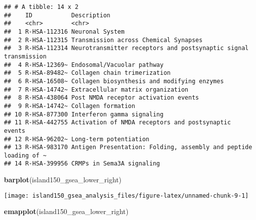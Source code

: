 \documentclass[
]{article}
\newenvironment{Shaded}{\begin{snugshade}}{\end{snugshade}}
\newcommand{\KeywordTok}[1]{\textcolor[rgb]{0.13,0.29,0.53}{\textbf{#1}}}
\newcommand{\NormalTok}[1]{#1}
\newcommand{\OperatorTok}[1]{\textcolor[rgb]{0.81,0.36,0.00}{\textbf{#1}}}
\newcommand{\StringTok}[1]{\textcolor[rgb]{0.31,0.60,0.02}{#1}}
\begin{document}
\begin{Shaded}
\end{Shaded}

\begin{verbatim}
## # A tibble: 14 x 2
##    ID           Description                                                     
##    <chr>        <chr>                                                           
##  1 R-HSA-112316 Neuronal System                                                 
##  2 R-HSA-112315 Transmission across Chemical Synapses                           
##  3 R-HSA-112314 Neurotransmitter receptors and postsynaptic signal transmission 
##  4 R-HSA-12369~ Endosomal/Vacuolar pathway                                      
##  5 R-HSA-89482~ Collagen chain trimerization                                    
##  6 R-HSA-16508~ Collagen biosynthesis and modifying enzymes                     
##  7 R-HSA-14742~ Extracellular matrix organization                               
##  8 R-HSA-438064 Post NMDA receptor activation events                            
##  9 R-HSA-14742~ Collagen formation                                              
## 10 R-HSA-877300 Interferon gamma signaling                                      
## 11 R-HSA-442755 Activation of NMDA receptors and postsynaptic events            
## 12 R-HSA-96202~ Long-term potentiation                                          
## 13 R-HSA-983170 Antigen Presentation: Folding, assembly and peptide loading of ~
## 14 R-HSA-399956 CRMPs in Sema3A signaling
\end{verbatim}

\begin{Shaded}
\begin{Highlighting}[]
\KeywordTok{barplot}\NormalTok{(island150_gsea_lower_right)}
\end{Highlighting}
\end{Shaded}

\texttt{[image: island150\_gsea\_analysis\_files/figure-latex/unnamed-chunk-9-1]}

\begin{Shaded}
\begin{Highlighting}[]
\KeywordTok{emapplot}\NormalTok{(island150_gsea_lower_right)}
\end{Highlighting}
\end{Shaded}
\end{document}
